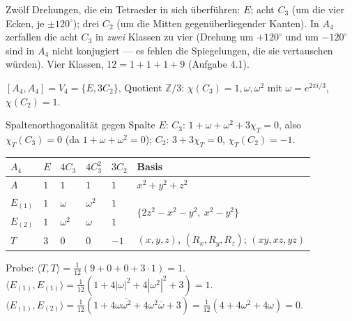 \begin{merksatz}
Zwölf Drehungen, die ein Tetraeder in sich überführen: $E$; acht $C_3$ (um die vier Ecken, je $\pm120^{\circ}$); drei $C_2$ (um die Mitten gegenüberliegender Kanten). In $A_4$ zerfallen die acht $C_3$ in \emph{zwei} Klassen zu vier (Drehung um $+120^{\circ}$ und um $-120^{\circ}$ sind in $A_4$ nicht konjugiert --- es fehlen die Spiegelungen, die sie vertauschen würden). Vier Klassen, $12 = 1 + 1 + 1 + 9$ (Aufgabe 4.1).

$[A_4, A_4] = V_4 = \{E, 3C_2\}$, Quotient $\mathbb Z/3$: $\chi(C_3) = 1, \omega, \omega^{2}$ mit $\omega = e^{2\pi i/3}$, $\chi(C_2) = 1$.

Spaltenorthogonalität gegen Spalte $E$: $C_3$: $1 + \omega + \omega^{2} + 3\chi_T = 0$, also $\chi_T(C_3) = 0$ (da $1 + \omega + \omega^{2} = 0$); $C_2$: $3 + 3\chi_T = 0$, $\chi_T(C_2) = -1$.

\begin{center}
{\small
\renewcommand{\arraystretch}{1.46}
\begin{tabular}{@{}P{1.0cm}P{0.7cm}P{1.0cm}P{1.0cm}P{0.9cm}P{4.6cm}@{}}
\toprule
$A_4$ & $E$ & $4C_3$ & $4C_3^{2}$ & $3C_2$ & \textbf{Basis}\\
\midrule
$A$ & $1$ & $1$ & $1$ & $1$ & $x^{2} + y^{2} + z^{2}$\\
$E_{(1)}$ & $1$ & $\omega$ & $\omega^{2}$ & $1$ & \\
$E_{(2)}$ & $1$ & $\omega^{2}$ & $\omega$ & $1$ & \\
$T$ & $3$ & $0$ & $0$ & $-1$ & $(x, y, z)$, $(R_x, R_y, R_z)$; $(xy, xz, yz)$\\
\bottomrule
\end{tabular}}
\end{center}
Probe: $\langle T, T\rangle = \frac1{12}(9 + 0 + 0 + 3\cdot1) = 1$. \checkmark\ $\langle E_{(1)}, E_{(1)}\rangle = \frac1{12}(1 + 4|\omega|^{2} + 4|\omega^{2}|^{2} + 3) = 1$. \checkmark\ $\langle E_{(1)}, E_{(2)}\rangle = \frac1{12}(1 + 4\omega\overline{\omega^{2}} + 4\omega^{2}\overline\omega + 3) = \frac1{12}(4 + 4\omega^{2} + 4\omega) = 0$. \checkmark
\end{merksatz}

